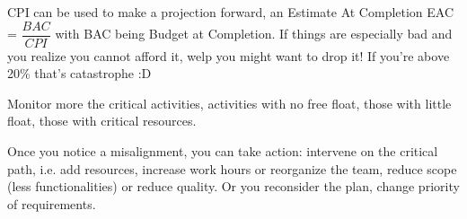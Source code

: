 \noindent CPI can be used to make a projection forward, an Estimate At Completion EAC = $\dfrac{BAC}{CPI}$ with BAC being Budget at Completion. If things are especially bad and you realize you cannot afford it, welp you might want to drop it! If you're above 20\% that's catastrophe :D

\noindent Monitor more the critical activities, activities with no free float, those with little float, those with critical resources.

\noindent Once you notice a misalignment, you can take action: intervene on the critical path, i.e. add resources, increase work hours or reorganize the team, reduce scope (less functionalities) or reduce quality. Or you reconsider the plan, change priority of requirements.

